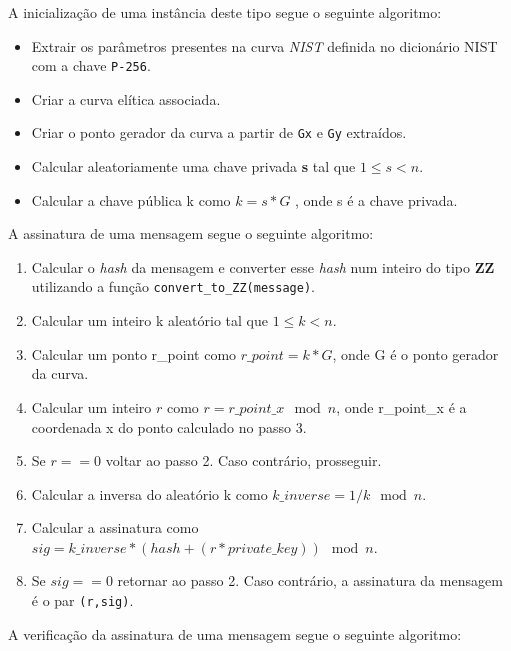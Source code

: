 \documentclass[11pt]{article}
\providecommand{\tightlist}{%
      \setlength{\itemsep}{0pt}\setlength{\parskip}{0pt}}
\begin{document}
A inicialização de uma instância deste tipo segue o seguinte algoritmo:

\begin{itemize}
\tightlist
\item
  Extrair os parâmetros presentes na curva \emph{NIST} definida no
  dicionário NIST com a chave \texttt{P-256}.
\item
  Criar a curva elítica associada.
\item
  Criar o ponto gerador da curva a partir de \texttt{Gx} e \texttt{Gy}
  extraídos.
\item
  Calcular aleatoriamente uma chave privada \textbf{s} tal que $1
  \leqslant s < n$.
  
\item
  Calcular a chave pública k como $ k = s * G $ , onde s é a chave
  privada.
\end{itemize}

A assinatura de uma mensagem segue o seguinte algoritmo:

\begin{enumerate}
\def\labelenumi{\arabic{enumi}.}
\tightlist
\item
  Calcular o \emph{hash} da mensagem e converter esse \emph{hash} num
  inteiro do tipo \textbf{ZZ} utilizando a função
  \texttt{convert\_to\_ZZ(message)}.
\item
  Calcular um inteiro k aleatório tal que $1 \leqslant k < n$.
\item
  Calcular um ponto r\_point como $ r\_point = k * G $, onde G é o
  ponto gerador da curva.
\item
  Calcular um inteiro $r$ como $r = r\_point\_x \mod n $, onde
  r\_point\_x é a coordenada x do ponto calculado no passo 3.
\item
  Se $ r == 0 $ voltar ao passo 2. Caso contrário, prosseguir.
\item
  Calcular a inversa do aleatório k como $ k\_inverse = 1/k \mod n $.
\item
  Calcular a assinatura como $ sig = k\_inverse * (hash + (r *
  private\_key)) \mod n $.
\item
  Se $ sig == 0$ retornar ao passo 2. Caso contrário, a assinatura da
  mensagem é o par \texttt{(r,sig)}.
\end{enumerate}

A verificação da assinatura de uma mensagem segue o seguinte algoritmo:
\end{document}
